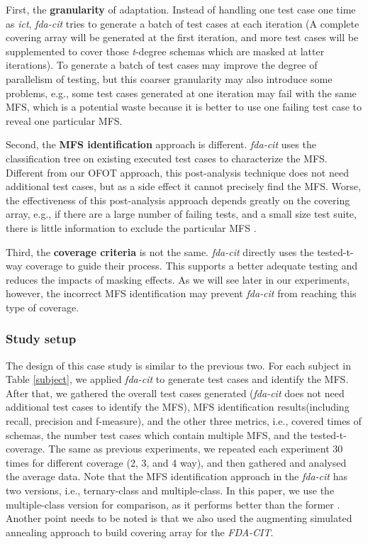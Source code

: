 \documentclass[10pt,journal,compsoc]{IEEEtran}
\begin{document}
First, the \textbf{granularity} of adaptation. Instead of handling one test case one time as \emph{ict}, \emph{fda-cit} tries to generate a batch of test cases at each iteration (A complete covering array will be generated at the first iteration, and more test cases will be supplemented to cover those \emph{t}-degree schemas which are masked at latter iterations). To generate a batch of test cases may improve the degree of parallelism of testing, but this coarser granularity may also introduce some problems, e.g., some test cases generated at one iteration may fail with the same MFS, which is a potential waste because it is better to use one failing test case to reveal one particular MFS.

Second, the \textbf{MFS identification} approach is different. \emph{fda-cit} uses the classification tree on existing executed test cases to characterize the MFS. Different from our OFOT approach, this post-analysis technique does not need additional test cases, but as a side effect it cannot precisely find the MFS. Worse, the effectiveness of this post-analysis approach depends greatly on the covering array, e.g., if there are a large number of failing tests, and a small size test suite, there is little information to exclude the particular MFS \cite{zhang2011characterizing}.

Third, the \textbf{coverage criteria} is not the same. \emph{fda-cit} directly uses the tested-t-way coverage to guide their process. This supports a better adequate testing and reduces the impacts of masking effects. As we will see later in our experiments, however, the incorrect MFS identification may prevent \emph{fda-cit} from reaching this type of coverage.


\subsubsection{Study setup}
The design of this case study is similar to the previous two. For each subject in Table \ref{subject}, we applied \emph{fda-cit} to generate test cases and identify the MFS. After that, we gathered the overall test cases generated (\emph{fda-cit} does not need additional test cases to identify the MFS), MFS identification results(including recall, precision and f-measure), and the other three metrics, i.e., covered times of schemas, the number test cases which contain multiple MFS, and the tested-t-coverage. The same as previous experiments, we repeated each experiment 30 times for different coverage (2, 3, and 4 way), and then gathered and analysed the average data.  Note that the MFS identification approach in the \emph{fda-cit} has two versions, i.e., ternary-class and multiple-class. In this paper, we use the multiple-class version for comparison, as it performs better than the former \cite{yilmaz2013reducing}. Another point needs to be noted is that we also used the augmenting simulated annealing approach \cite{cohen2003augmenting,cohen2008constructing2} to build covering array for the \emph{FDA-CIT}.
\end{document}
